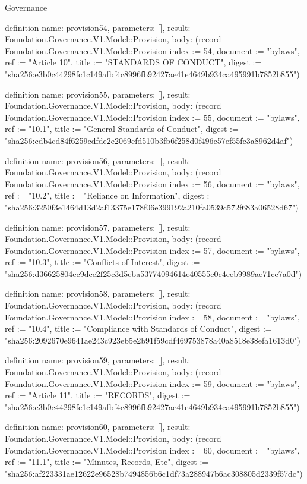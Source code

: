 \begin{lexlean}{Governance}
\begin{semanticmodule}
definition{
  name: provision54,
  parameters: [],
  result: Foundation.Governance.V1.Model::Provision,
  body: (record Foundation.Governance.V1.Model::Provision {index := 54, document := "bylaws", ref := "Article 10", title := "STANDARDS OF CONDUCT", digest := "sha256:e3b0c44298fc1c149afbf4c8996fb92427ae41e4649b934ca495991b7852b855"})
}

definition{
  name: provision55,
  parameters: [],
  result: Foundation.Governance.V1.Model::Provision,
  body: (record Foundation.Governance.V1.Model::Provision {index := 55, document := "bylaws", ref := "10.1", title := "General Standards of Conduct", digest := "sha256:cdb4cd84f6259cdfde2e2069efd510b3fb6f258d0f496c57ef55fc3a8962d4af"})
}

definition{
  name: provision56,
  parameters: [],
  result: Foundation.Governance.V1.Model::Provision,
  body: (record Foundation.Governance.V1.Model::Provision {index := 56, document := "bylaws", ref := "10.2", title := "Reliance on Information", digest := "sha256:3250f3e1464d13d2af13375e178f06e399192a210fa0539c572f683a06528d67"})
}

definition{
  name: provision57,
  parameters: [],
  result: Foundation.Governance.V1.Model::Provision,
  body: (record Foundation.Governance.V1.Model::Provision {index := 57, document := "bylaws", ref := "10.3", title := "Conflicts of Interest", digest := "sha256:d36625804ec9dce2f25c3d5eba53774094614e40555c0c4eeb9989ae71ce7a0d"})
}

definition{
  name: provision58,
  parameters: [],
  result: Foundation.Governance.V1.Model::Provision,
  body: (record Foundation.Governance.V1.Model::Provision {index := 58, document := "bylaws", ref := "10.4", title := "Compliance with Standards of Conduct", digest := "sha256:2092670e9641ae243c923eb5e2b91f59cdf469753878a40a8518e38efa1613d0"})
}

definition{
  name: provision59,
  parameters: [],
  result: Foundation.Governance.V1.Model::Provision,
  body: (record Foundation.Governance.V1.Model::Provision {index := 59, document := "bylaws", ref := "Article 11", title := "RECORDS", digest := "sha256:e3b0c44298fc1c149afbf4c8996fb92427ae41e4649b934ca495991b7852b855"})
}

definition{
  name: provision60,
  parameters: [],
  result: Foundation.Governance.V1.Model::Provision,
  body: (record Foundation.Governance.V1.Model::Provision {index := 60, document := "bylaws", ref := "11.1", title := "Minutes, Records, Etc", digest := "sha256:af223331ae12622e96528b7494856b6c1df73a288947b6ac308805d2339f57dc"})
}


\end{semanticmodule}
\end{lexlean}
